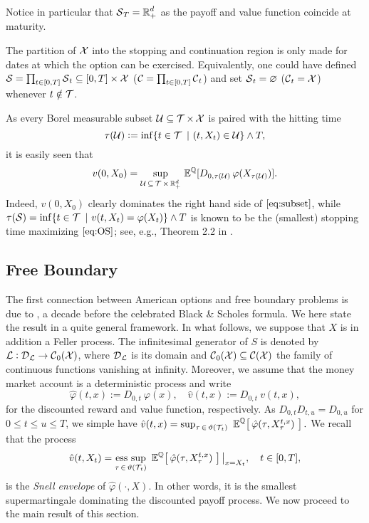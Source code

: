 Notice in particular that $\operatorname{\mathcal{S}}_T=\operatorname{\mathbb{R}}^d_+$ as the payoff and value function coincide at maturity.
\begin{remark}
The partition of $\operatorname{\mathcal{X}}$ into the stopping and continuation region is only made for dates at which the option can be exercised. Equivalently, one could have defined 
$\operatorname{\mathcal{S}} = \prod_{t\in [0,T]} \operatorname{\mathcal{S}}_t \subseteq [0,T]\times \operatorname{\mathcal{X}}$ ($\operatorname{\mathcal{C}} = \prod_{t\in [0,T]} \operatorname{\mathcal{C}}_t$) and set $\operatorname{\mathcal{S}}_t =\varnothing$ ($\operatorname{\mathcal{C}}_t =\operatorname{\mathcal{X}}$) whenever $t\notin \operatorname{\mathcal{T}}$. 
\end{remark}
As every Borel measurable subset $\operatorname{\mathcal{U}} \subseteq \operatorname{\mathcal{T}} \times \operatorname{\mathcal{X}}$ is paired with the hitting time $$\tau(\calU) := \inf\{t\in \calT \ | \ (t,X_t) \in \calU \}\wedge T,$$
it is easily seen that
\begin{equation}\label{eq:subset}
   v(0,X_0) =\underset{\operatorname{\mathcal{U}} \, \subseteq \, \operatorname{\mathcal{T}} \times \operatorname{\mathbb{R}}^d_+}{\text{sup}} \, \operatorname{\mathbb{E}}^{\operatorname{\mathbb{Q}}}[D_{0,\tau(\operatorname{\mathcal{U}})}\, \varphi(X_{\tau(\operatorname{\mathcal{U}})})].  
\end{equation}
Indeed, $v(0,X_0)$ clearly dominates the right hand side of $\eqref{eq:subset}$, while  $\tau(\operatorname{\mathcal{S}})= \inf\{t\in \operatorname{\mathcal{T}} \ | \ v(t,X_t)= \varphi(X_t) \} \wedge T$ is known to be the (smallest)   stopping time maximizing $\eqref{eq:OS}$; see, e.g., Theorem 2.2 in  \citet{PeskirShiryaev}. 

\subsection{Free Boundary}

The first connection between American options and free boundary problems is due to
\citet{mcKean}, a decade before the celebrated Black \& Scholes formula. We here state the result in a quite general framework. In what follows, we suppose that $X$ is in addition a Feller process. The infinitesimal generator of $S$ is denoted by $\operatorname{\mathcal{L}}: \operatorname{\mathcal{D}}_{\operatorname{\mathcal{L}}} \to \operatorname{\mathcal{C}}_0(\operatorname{\mathcal{X}})$, where $\operatorname{\mathcal{D}}_{\operatorname{\mathcal{L}}}$ is its domain and $\operatorname{\mathcal{C}}_0(\operatorname{\mathcal{X}}) \subseteq \operatorname{\mathcal{C}}(\operatorname{\mathcal{X}})$ the family of  continuous functions  vanishing at infinity.  
Moreover, we assume that the money market account is a deterministic process and write $$\hat{\varphi}(t,x):= D_{0,t}\ \varphi(x), \quad \hat{v}(t,x):= D_{0,t} \ v(t,x),$$
for the discounted reward and value function, respectively. As $D_{0,t}D_{t,u}=D_{0,u}$ for $0\le t \le u \le  T$, we simple have   $\hat{v}(t,x)= \sup_{\tau \, \in\,  \vartheta(\operatorname{\mathcal{T}}_{\!t})} \ \operatorname{\mathbb{E}}^{\operatorname{\mathbb{Q}}}\! \left[ \,  \hat{\varphi}(\tau, X^{t,x}_\tau)\ \right].$ We recall that the process 
$$\hat{v}(t,X_t)= \underset{\tau \, \in\,  \vartheta(\operatorname{\mathcal{T}}_{\!t})}{\text{ess sup}} \ \operatorname{\mathbb{E}}^{\operatorname{\mathbb{Q}}}\! \left[ \,  \hat{\varphi}(\tau, X^{t,x}_\tau)\ \right]\big |_{x=X_t}, \quad t \in [0,T],$$
is the \textit{Snell envelope} of $\hat{\varphi}(\cdot,X)$. 
In other words, it is the smallest supermartingale dominating the discounted payoff process. We  now proceed to the main result of this section.  

